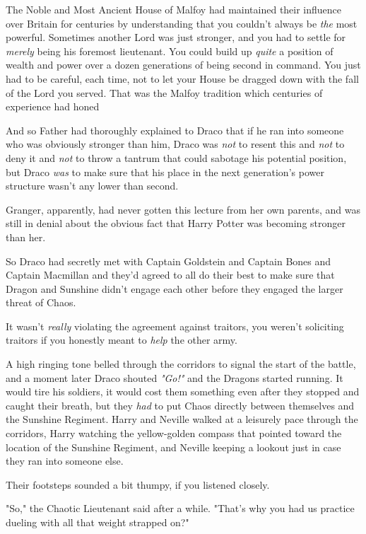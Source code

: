 The Noble and Most Ancient House of Malfoy had maintained their influence over
Britain for centuries by understanding that you couldn't always be \emph{the}
most powerful. Sometimes another Lord was just stronger, and you had to settle
for \emph{merely} being his foremost lieutenant. You could build up
\emph{quite} a position of wealth and power over a dozen generations of being
second in command. You just had to be careful, each time, not to let your House
be dragged down with the fall of the Lord you served. That was the Malfoy
tradition which centuries of experience had honed{\el}

And so Father had thoroughly explained to Draco that if he ran into someone who
was obviously stronger than him, Draco was \emph{not} to resent this and
\emph{not} to deny it and \emph{not} to throw a tantrum that could sabotage his
potential position, but Draco \emph{was} to make sure that his place in the
next generation's power structure wasn't any lower than second.

Granger, apparently, had never gotten this lecture from her own parents, and
was still in denial about the obvious fact that Harry Potter was becoming
stronger than her.

So Draco had secretly met with Captain Goldstein and Captain Bones and Captain
Macmillan and they'd agreed to all do their best to make sure that Dragon and
Sunshine didn't engage each other before they engaged the larger threat of
Chaos.

It wasn't \emph{really} violating the agreement against traitors, you weren't
soliciting traitors if you honestly meant to \emph{help} the other army.

A high ringing tone belled through the corridors to signal the start of the
battle, and a moment later Draco shouted \emph{"Go!"} and the Dragons started
running. It would tire his soldiers, it would cost them something even after
they stopped and caught their breath, but they \emph{had} to put Chaos directly
between themselves and the Sunshine Regiment.
\sbreak
Harry and Neville walked at a leisurely pace through the corridors, Harry
watching the yellow-golden compass that pointed toward the location of the
Sunshine Regiment, and Neville keeping a lookout just in case they ran into
someone else.

Their footsteps sounded a bit thumpy, if you listened closely.

"So," the Chaotic Lieutenant said after a while. "That's why you had us
practice dueling with all that weight strapped on?"

